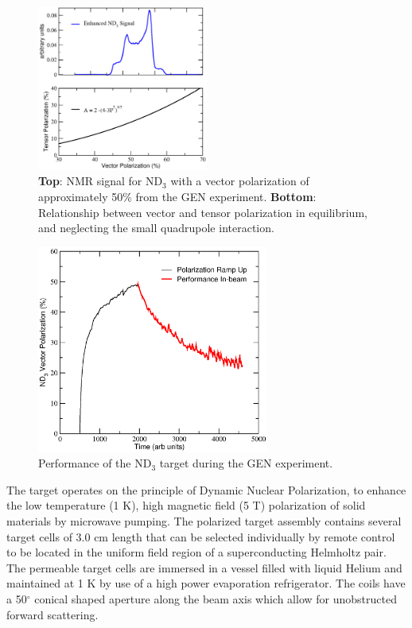 \begin{figure}
\centering
\includegraphics[width=0.5\textwidth]{figs/tensor_pol3.eps}
\caption{{\bf Top}: NMR signal for ND$_3$ with a vector polarization of approximately 50\% from the GEN experiment.  %
{\bf Bottom}: Relationship between vector and tensor polarization in equilibrium, and 
neglecting the small quadrupole interaction.  \label{fig:tensorpol}}
\end{figure}

\begin{figure}
\centering
\includegraphics[width=3.0in,clip]{figs/gen.eps} %
\caption{Performance of the ND$_3$ target during the GEN experiment.  \label{fig:gen}}
\end{figure}


The target operates on the principle of Dynamic Nuclear Polarization, to
enhance the low temperature (1 K), high magnetic field (5 T) polarization of solid
materials  by microwave pumping.
The polarized target assembly contains several target cells of 3.0 cm length
that can be  selected individually by remote control to be located in the uniform field
region of a superconducting Helmholtz pair. The permeable target cells are
immersed in a  vessel filled with liquid Helium and maintained at 1 K by use of a
high power evaporation refrigerator.
The coils have a 50$^\circ$ conical shaped aperture along the beam axis
which allow for unobstructed forward scattering.

